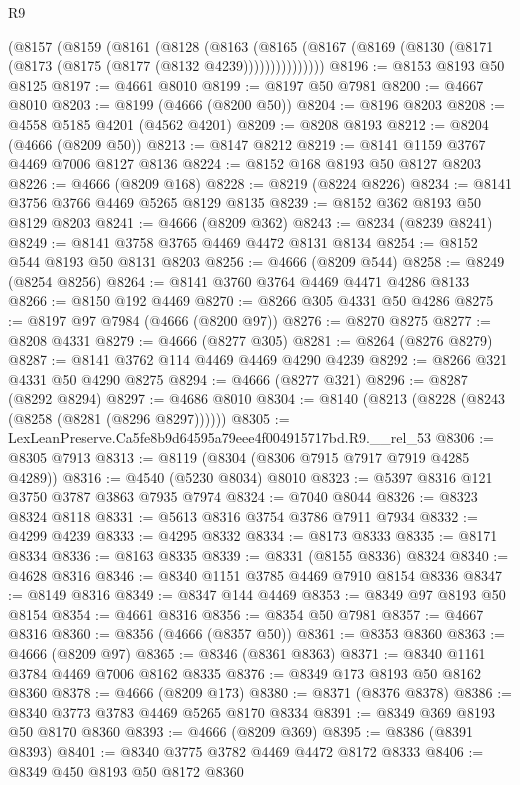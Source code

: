 \begin{lexlean}{R9}
\begin{coremodule}
      (@8157
        (@8159
          (@8161
            (@8128
              (@8163
                (@8165 (@8167 (@8169 (@8130 (@8171 (@8173 (@8175 (@8177 (@8132 @4239)))))))))))))))
@8196 := @8153 @8193 @50 @8125
@8197 := @4661 @8010
@8199 := @8197 @50 @7981
@8200 := @4667 @8010
@8203 := @8199 (@4666 (@8200 @50))
@8204 := @8196 @8203
@8208 := @4558 @5185 @4201 (@4562 @4201)
@8209 := @8208 @8193
@8212 := @8204 (@4666 (@8209 @50))
@8213 := @8147 @8212
@8219 := @8141 @1159 @3767 @4469 @7006 @8127 @8136
@8224 := @8152 @168 @8193 @50 @8127 @8203
@8226 := @4666 (@8209 @168)
@8228 := @8219 (@8224 @8226)
@8234 := @8141 @3756 @3766 @4469 @5265 @8129 @8135
@8239 := @8152 @362 @8193 @50 @8129 @8203
@8241 := @4666 (@8209 @362)
@8243 := @8234 (@8239 @8241)
@8249 := @8141 @3758 @3765 @4469 @4472 @8131 @8134
@8254 := @8152 @544 @8193 @50 @8131 @8203
@8256 := @4666 (@8209 @544)
@8258 := @8249 (@8254 @8256)
@8264 := @8141 @3760 @3764 @4469 @4471 @4286 @8133
@8266 := @8150 @192 @4469
@8270 := @8266 @305 @4331 @50 @4286
@8275 := @8197 @97 @7984 (@4666 (@8200 @97))
@8276 := @8270 @8275
@8277 := @8208 @4331
@8279 := @4666 (@8277 @305)
@8281 := @8264 (@8276 @8279)
@8287 := @8141 @3762 @114 @4469 @4469 @4290 @4239
@8292 := @8266 @321 @4331 @50 @4290 @8275
@8294 := @4666 (@8277 @321)
@8296 := @8287 (@8292 @8294)
@8297 := @4686 @8010
@8304 := @8140 (@8213 (@8228 (@8243 (@8258 (@8281 (@8296 @8297))))))
@8305 := LexLeanPreserve.Ca5fe8b9d64595a79eee4f004915717bd.R9.__rel_53
@8306 := @8305 @7913
@8313 := @8119 (@8304 (@8306 @7915 @7917 @7919 @4285 @4289))
@8316 := @4540 (@5230 @8034) @8010
@8323 := @5397 @8316 @121 @3750 @3787 @3863 @7935 @7974
@8324 := @7040 @8044
@8326 := @8323 @8324 @8118
@8331 := @5613 @8316 @3754 @3786 @7911 @7934
@8332 := @4299 @4239
@8333 := @4295 @8332
@8334 := @8173 @8333
@8335 := @8171 @8334
@8336 := @8163 @8335
@8339 := @8331 (@8155 @8336) @8324
@8340 := @4628 @8316
@8346 := @8340 @1151 @3785 @4469 @7910 @8154 @8336
@8347 := @8149 @8316
@8349 := @8347 @144 @4469
@8353 := @8349 @97 @8193 @50 @8154
@8354 := @4661 @8316
@8356 := @8354 @50 @7981
@8357 := @4667 @8316
@8360 := @8356 (@4666 (@8357 @50))
@8361 := @8353 @8360
@8363 := @4666 (@8209 @97)
@8365 := @8346 (@8361 @8363)
@8371 := @8340 @1161 @3784 @4469 @7006 @8162 @8335
@8376 := @8349 @173 @8193 @50 @8162 @8360
@8378 := @4666 (@8209 @173)
@8380 := @8371 (@8376 @8378)
@8386 := @8340 @3773 @3783 @4469 @5265 @8170 @8334
@8391 := @8349 @369 @8193 @50 @8170 @8360
@8393 := @4666 (@8209 @369)
@8395 := @8386 (@8391 @8393)
@8401 := @8340 @3775 @3782 @4469 @4472 @8172 @8333
@8406 := @8349 @450 @8193 @50 @8172 @8360

\end{coremodule}
\end{lexlean}
